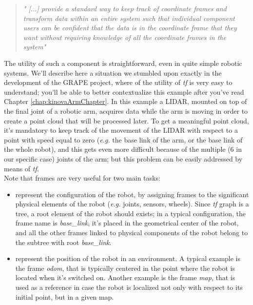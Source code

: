 \blockquote{
\textit{" [...] provide a standard way to keep track of coordinate frames and transform data within an entire system such that individual component users can be confident that the data is in the coordinate frame that they want without requiring knowledge of all the coordinate
frames in the system" \parencite{tfPaper}}
}
The utility of such a component is straightforward, even in quite simple robotic systems. We'll describe here a situation we stumbled upon exactly in the development of the \ac{GRAPE} project, where of the utility of \textit{tf} is very easy to understand; you'll be able to better contextualize this example after you've read Chapter \ref{chap:kinovaArmChapter}. In this example a \ac{LIDAR}, mounted on top of the final joint of a robotic arm, acquires data while the arm is moving in order to create a point cloud that will be processed later. To get a meaningful point cloud, it's mandatory to keep track of the movement of the \ac{LIDAR} with respect to a point with speed equal to zero (\textit{e.g.} the base link of the arm, or the base link of the whole robot), and this gets even more difficult because of the multiple (6 in our specific case) joints of the arm; but this problem can be easily addressed by means of \textit{tf}.\\
Note that frames are very useful for two main tasks:
\begin{itemize}
	\item represent the configuration of the robot, by assigning frames to the significant physical elements of the robot (\textit{e.g.} joints, sensors, wheels). Since \textit{tf} graph is a tree, a root element of the robot should exists; in a typical configuration, the frame name is \textit{base\_link}, it's placed in the geometrical center of the robot, and all the other frames linked to physical components of the robot belong to the subtree with root \textit{base\_link}.
	\item represent the position of the robot in an environment. A typical example is the frame \textit{odom}, that is typically centered in the point where the robot is located when it's switched on. Another example is the frame \textit{map}, that is used as a reference in case the robot is localized not only with respect to its initial point, but in a given map.
\end{itemize}

